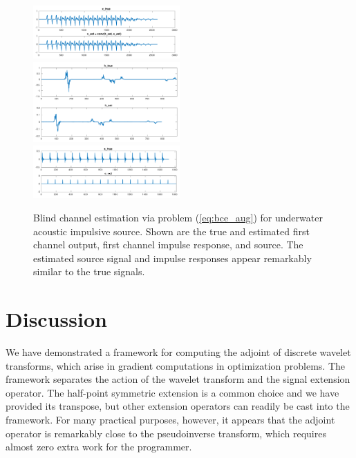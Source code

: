 \documentclass[journal]{IEEEtran}
\begin{document}
\begin{figure}
   \centering
   \includegraphics[width=0.5\textwidth]{figures/bce_rec_003_x_trim.pdf}
   \includegraphics[width=0.5\textwidth]{figures/bce_rec_003_h_trim.pdf}
   \includegraphics[width=0.5\textwidth]{figures/bce_rec_003_s_trim.pdf}
   \caption{Blind channel estimation via problem (\ref{eq:bce_aug}) for underwater acoustic impulsive source.  Shown are the true and estimated first channel output, first channel impulse response, and source.  The estimated source signal and impulse responses appear remarkably similar to the true signals.}
   \label{fig:bce_rec}
\end{figure}




\section{Discussion}
We have demonstrated a framework for computing the adjoint of discrete wavelet transforms, which arise in gradient computations in optimization problems.  The framework separates the action of the wavelet transform and the signal extension operator.  The half-point symmetric extension is a common choice and we have provided its transpose, but other extension operators can readily be cast into the framework.  For many practical purposes, however, it appears that the adjoint operator is remarkably close to the pseudoinverse transform, which requires almost zero extra work for the programmer.\\
\end{document}
